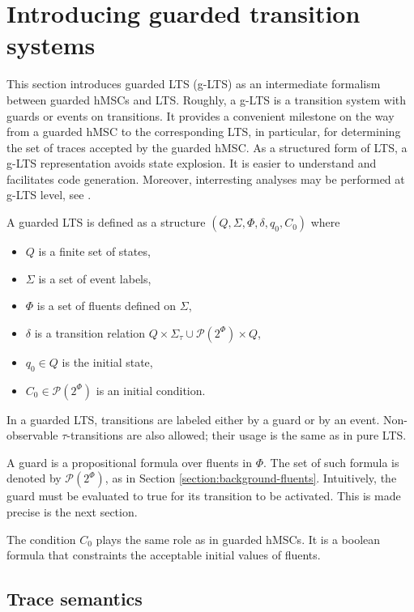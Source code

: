 \section{Introducing guarded transition systems\label{section:deductive-glts}}

This section introduces guarded LTS (g-LTS) as an intermediate formalism between guarded hMSCs and LTS. Roughly, a g-LTS is a transition system with guards or events on transitions. It provides a convenient milestone on the way from a guarded hMSC to the corresponding LTS, in particular, for determining the set of traces accepted by the guarded hMSC. As a structured form of LTS, a g-LTS representation avoids state explosion. It is easier to understand and facilitates code generation. Moreover, interresting analyses may be performed at g-LTS level, see \cite{Damas:2011}.

\begin{definition}
\noindent A guarded LTS is defined as a structure $(Q,\Sigma,\Phi,\delta,q_{0},C_{0})$ where 
\begin{itemize}
\item $Q$ is a finite set of states,
\item $\Sigma$ is a set of event labels, 
\item $\Phi$ is a set of fluents defined on $\Sigma$,
\item $\delta$ is a transition relation $Q \times \Sigma_{\tau}\cup\mathcal{P}(2^\Phi) \times Q$,
\item $q_{0} \in Q$ is the initial state,
\item $C_{0} \in \mathcal{P}(2^\Phi)$ is an initial condition. 
\end{itemize}
\end{definition}

In a guarded LTS, transitions are labeled either by a guard or by an event. Non-observable $\tau$-transitions are also allowed; their usage is the same as in pure LTS. 

A guard is a propositional formula over fluents in $\Phi$. The set of such formula is denoted by $\mathcal{P}(2^\Phi)$, as in Section \ref{section:background-fluents}. Intuitively, the guard must be evaluated to true for its transition to be activated. This is made precise is the next section.

The condition $C_0$ plays the same role as in guarded hMSCs. It is a boolean formula that constraints the acceptable initial values of fluents. 

\subsection{Trace semantics\label{subsection:glts-trace-semantics}} 

